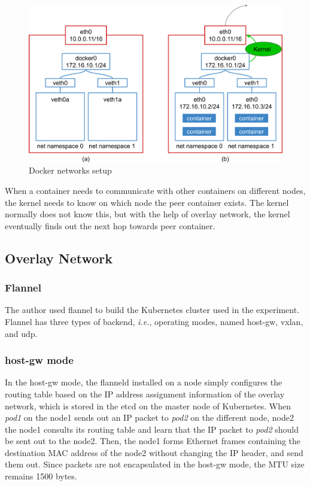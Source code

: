 \begin{figure}[h]
  \centering
  \includegraphics[width=0.8\columnwidth]{Figs/bridge+veth}

  \par\bigskip
  \centering
  \begin{minipage}{0.9\columnwidth}
    \caption[Docker networks setup]{
      Docker networks setup
    }
    \label{fig:bridge+veth}
  \end{minipage}
\end{figure}
 
When a container needs to communicate with other containers on different nodes, the kernel needs to know on which node the peer container exists.
The kernel normally does not know this, but with the help of overlay network, the kernel eventually finds out the next hop towards peer container.

\FloatBarrier

\subsection{Overlay Network}

\subsubsection{Flannel}

The author used flannel to build the Kubernetes cluster used in the experiment.
Flannel has three types of backend, {\it i.e.}, operating modes, named host-gw, vxlan, and udp\cite{CoreOSFlannelBackend}.

\subsubsection{host-gw mode}

In the host-gw mode, the flanneld installed on a node simply configures the routing table 
based on the IP address assignment information of the overlay network, which is stored in the etcd on the master node of Kubernetes.
When {\em pod1} on the node1 sends out an IP packet to {\em pod2} on the different node, node2 
the node1 consults its routing table and learn that the IP packet to {\em pod2} should be sent out to the node2.
Then, the node1 forms Ethernet frames containing the destination MAC address of the node2 
without changing the IP header, and send them out.
Since packets are not encapsulated in the host-gw mode, the MTU size remains 1500 bytes.

